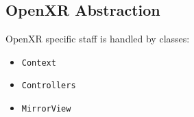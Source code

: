 \newpage
\subsection{OpenXR Abstraction}
\label{sec:openxr}
OpenXR specific staff is handled by classes:
\begin{itemize}
    \item \texttt{Context}
    \item \texttt{Controllers}
    \item \texttt{MirrorView}
\end{itemize}